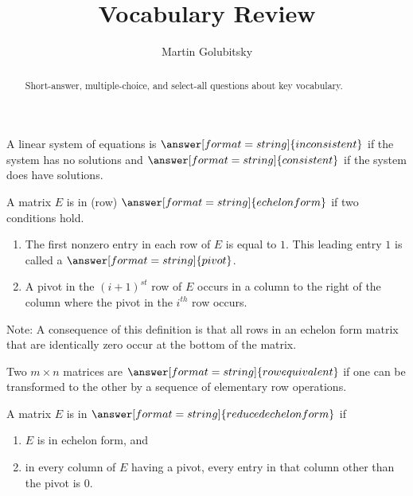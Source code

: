 \documentclass[nooutcomes]{ximera}
\title{Vocabulary Review}
\author{Martin Golubitsky}
\begin{document}
\begin{abstract}
Short-answer, multiple-choice, and select-all questions about key vocabulary. 
\end{abstract}
\maketitle

%

\begin{question}
A linear system of equations is $\answer[format=string]{inconsistent}$ if the system has no solutions and $\answer[format=string]{consistent}$ if the system does have solutions. 
\end{question} 

\begin{question}
A matrix $E$ is in (row) $\answer[format=string]{echelon form}$ if two conditions hold.
\begin{enumerate}
\item The first nonzero entry in each row of $E$ is equal to $1$. This leading entry $1$ is called a 
$\answer[format=string]{pivot}$.
\item A pivot in the $(i + 1)^{st}$ row of $E$ occurs in a column to the right of the column where the pivot in the $i^{th}$ row occurs.
\end{enumerate}

Note: A consequence of this definition is that all rows in an echelon form matrix that are identically zero occur at the bottom of the matrix.
\end{question} 

\begin{question}
Two $m \times n$ matrices are $\answer[format=string]{row equivalent}$ if one can be transformed to the other by a sequence of elementary row operations. 
\end{question} 

\begin{question}
A matrix $E$ is in $\answer[format=string]{reduced echelon form}$ if 
\begin{enumerate}
\item $E$ is in echelon form, and
\item in every column of $E$ having a pivot, every entry in that column other than the pivot is $0$.
\end{enumerate}

\end{question} 
\end{document}
